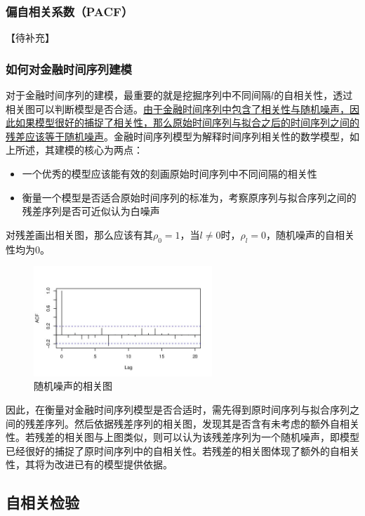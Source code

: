 \documentclass[11pt]{article}
\begin{document}
\subsubsection{偏自相关系数（PACF）}

【待补充】

\subsubsection{如何对金融时间序列建模}

对于金融时间序列的建模，最重要的就是挖掘序列中不同间隔$l$的自相关性，透过相关图可以判断模型是否合适。\uline{由于金融时间序列中包含了相关性与随机噪声，因此如果模型很好的捕捉了相关性，那么原始时间序列与拟合之后的时间序列之间的残差应该等于随机噪声}。金融时间序列模型为解释时间序列相关性的数学模型，如上所述，其建模的核心为两点：
\begin{itemize}
    \item 一个优秀的模型应该能有效的刻画原始时间序列中不同间隔的相关性
    \item 衡量一个模型是否适合原始时间序列的标准为，考察原序列与拟合序列之间的残差序列是否可近似认为白噪声
\end{itemize}

对残差画出相关图，那么应该有其$\rho_0=1$，当$l\neq 0$时，$\rho_l=0$，随机噪声的自相关性均为0。

\begin{figure}[H]
    \centering
    \includegraphics[width=0.6\textwidth]{fig/white-noise-acf.jpg}
    \caption{随机噪声的相关图}
    \label{fig:white-noise-acf}
\end{figure}

因此，在衡量对金融时间序列模型是否合适时，需先得到原时间序列与拟合序列之间的残差序列。然后依据残差序列的相关图，发现其是否含有未考虑的额外自相关性。若残差的相关图与上图类似，则可以认为该残差序列为一个随机噪声，即模型已经很好的捕捉了原时间序列中的自相关性。若残差的相关图体现了额外的自相关性，其将为改进已有的模型提供依据。

\subsection{自相关检验}
\end{document}
